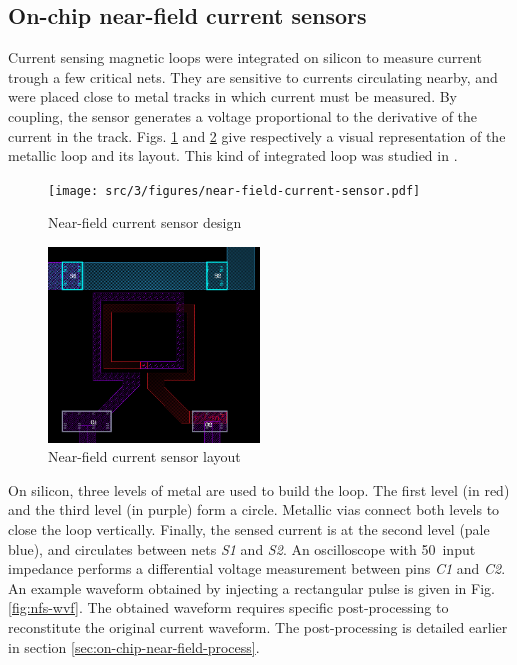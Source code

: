 \subsection{On-chip near-field current sensors}

Current sensing magnetic loops were integrated on silicon to measure current trough a few critical nets.
They are sensitive to currents circulating nearby, and were placed close to metal tracks in which current must be measured.
By coupling, the sensor generates a voltage proportional to the derivative of the current in the track.
Figs. \ref{fig:near-field-current-sensor} and \ref{fig:near-field-current-sensor-layout} give respectively a visual representation of the metallic loop and its layout.
This kind of integrated loop was studied in \cite{OtherInductors, InductorsLAAS1, InductorsLAAS2, AlainSallesInductors}.

\begin{figure}[!h]
  \centering
  \texttt{[image: src/3/figures/near-field-current-sensor.pdf]}
  \caption{Near-field current sensor design}
  \label{fig:near-field-current-sensor}
\end{figure}

\begin{figure}[!h]
  \centering
  \includegraphics[width=0.5\textwidth]{src/3/figures/sensor_layout.png}
  \caption{Near-field current sensor layout}
  \label{fig:near-field-current-sensor-layout}
\end{figure}

On silicon, three levels of metal are used to build the loop.
The first level (in red) and the third level (in purple) form a circle.
Metallic vias connect both levels to close the loop vertically.
Finally, the sensed current is at the second level (pale blue), and circulates between nets \textit{S1} and \textit{S2}.
An oscilloscope with 50\textOmega\ input impedance performs a differential voltage measurement between pins \textit{C1} and \textit{C2}.
An example waveform obtained by injecting a rectangular pulse is given in Fig. \ref{fig:nfs-wvf}.
The obtained waveform requires specific post-processing to reconstitute the original current waveform.
The post-processing is detailed earlier in section \ref{sec:on-chip-near-field-process}.

